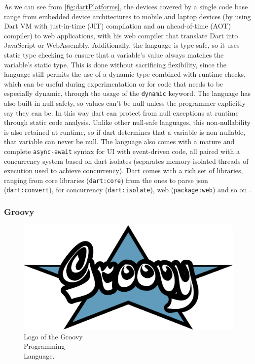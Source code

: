 \noindent As we can see from \cref{fig:dartPlatforms}, the devices covered by a single code base range from embedded device architectures to mobile and laptop devices (by using Dart VM with just-in-time (JIT) compilation and an ahead-of-time (AOT) compiler) to web applications, with his web compiler that translate Dart into JavaScript or WebAssembly. Additionally, the language is type safe, so it uses static type checking to ensure that a variable's value always matches the variable's static type. This is done without sacrificing flexibility, since the language still permits the use of a dynamic type combined with runtime checks, which can be useful during experimentation or for code that needs to be especially dynamic, through the usage of the \texttt{dynamic} keyword. The language has also built-in null safety, so values can't be null unless the programmer explicitly say they can be. In this way dart can protect from null exceptions at runtime through static code analysis. Unlike other null-safe languages, this non-nullability is also retained at runtime, so if dart determines that a variable is non-nullable, that variable can never be null. The language also comes with a mature and complete \texttt{async-await} syntax for UI with event-driven code, all paired with a concurrency system based on dart isolates (separates memory-isolated threads of execution used to achieve concurrency). Dart comes with a rich set of libraries, ranging from core libraries (\texttt{dart:core}) from the ones to parse json (\texttt{dart:convert}), for concurrency (\texttt{dart:isolate}), web (\texttt{package:web}) and so on \cite{Dart}.

\subsubsection{Groovy}

\begin{figure} %
    \centering
    \includegraphics[width=\linewidth]{images/groovy.png}
    \caption{Logo of the Groovy\\Programming\\Language.}
\end{figure}

